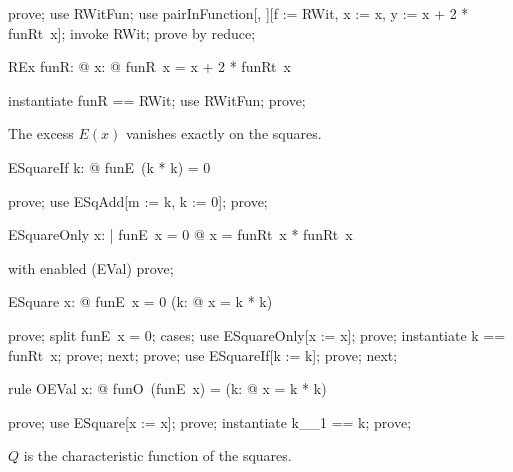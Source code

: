 \documentclass{article}
\begin{document}
\begin{zproof}
prove;
use RWitFun;
use pairInFunction[\nat, \nat][f := RWit, x := x, y := x + 2 * funRt~x];
invoke RWit;
prove by reduce;
\end{zproof}

\begin{theorem}{REx}
  \exists funR: \nat \fun \nat @ \forall x: \nat @ funR~x = x + 2 * funRt~x
\end{theorem}

\begin{zproof}
instantiate funR == RWit;
use RWitFun;
prove;
\end{zproof}

The excess $E(x)$ vanishes exactly on the squares.

\begin{theorem}{ESquareIf}
  \forall k: \nat @ funE~(k * k) = 0
\end{theorem}

\begin{zproof}
prove;
use ESqAdd[m := k, k := 0];
prove;
\end{zproof}

\begin{theorem}{ESquareOnly}
  \forall x: \nat | funE~x = 0 @ x = funRt~x * funRt~x
\end{theorem}

\begin{zproof}
with enabled (EVal) prove;
\end{zproof}

\begin{theorem}{ESquare}
  \forall x: \nat @ funE~x = 0 \iff (\exists k: \nat @ x = k * k)
\end{theorem}

\begin{zproof}
prove;
split funE~x = 0;
cases;
use ESquareOnly[x := x];
prove;
instantiate k == funRt~x;
prove;
next;
prove;
use ESquareIf[k := k];
prove;
next;
\end{zproof}

\begin{theorem}{rule OEVal}
  \forall x: \nat @ funO~(funE~x) = \IF (\exists k: \nat @ x = k * k)  
\end{theorem}

\begin{zproof}
prove;
use ESquare[x := x];
prove;
instantiate k\_\_1 == k;
prove;
\end{zproof}

$Q$ is the characteristic function of the squares.
\end{document}
